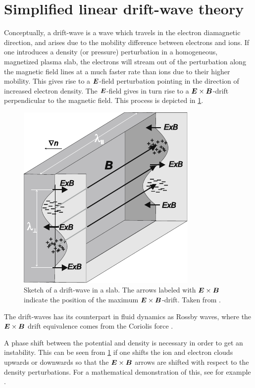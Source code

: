 \section{Simplified linear drift-wave theory}
\label{sec:simpleLin}
%
Conceptually, a drift-wave is a wave which travels in the electron diamagnetic direction, and arises due to the mobility difference between electrons and ions.
If one introduces a density (or pressure) perturbation in a homogeneous, magnetized plasma slab, the electrons will stream out of the perturbation along the magnetic field lines at a much faster rate than ions due to their higher mobility.
This gives rise to a $\boldsymbol{E}$-field perturbation pointing in the direction of increased electron density.
The $\boldsymbol{E}$-field gives in turn rise to a $\boldsymbol{E}\times\boldsymbol{B}$-drift perpendicular to the magnetic field.
This process is depicted in \cref{fig:DW}.
%
\begin{figure}[htb]
    \centering
    \includegraphics{fig/driftwave}
    \caption{
        Sketch of a drift-wave in a slab.
        The arrows labeled with $\boldsymbol{E}\times\boldsymbol{B}$ indicate the position of the maximum $\boldsymbol{E}\times\boldsymbol{B}$-drift.
        Taken from \cite{Stroth2011book}.
    }
    \label{fig:DW}
\end{figure}
%
The drift-waves has its counterpart in fluid dynamics as Rossby waves, where the $\boldsymbol{E}\times\boldsymbol{B}$ drift equivalence comes from the Coriolis force \cite{Shepherd1987}.

A phase shift between the potential and density is necessary in order to get an instability.
This can be seen from \cref{fig:DW} if one shifts the ion and electron clouds upwards or downwards so that the $\boldsymbol{E}\times\boldsymbol{B}$ arrows are shifted with respect to the density perturbations.
For a mathematical demonstration of this, see for example \cite{Garcia2001a}.

